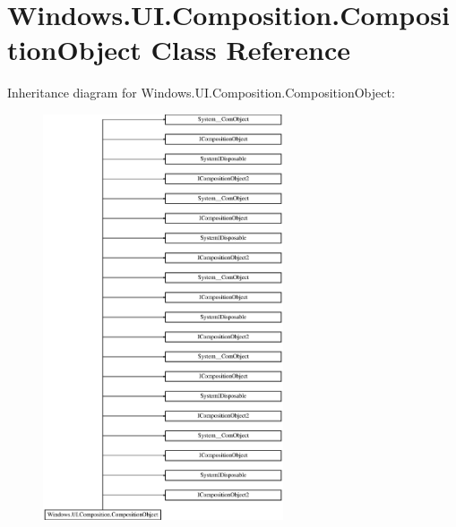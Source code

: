 \hypertarget{class_windows_1_1_u_i_1_1_composition_1_1_composition_object}{}\section{Windows.\+U\+I.\+Composition.\+Composition\+Object Class Reference}
\label{class_windows_1_1_u_i_1_1_composition_1_1_composition_object}
Inheritance diagram for Windows.\+U\+I.\+Composition.\+Composition\+Object\+:\begin{figure}[H]
\begin{center}
\leavevmode
\includegraphics[height=12.000000cm]{class_windows_1_1_u_i_1_1_composition_1_1_composition_object}
\end{center}
\end{figure}
